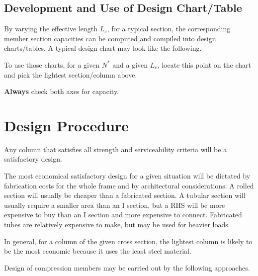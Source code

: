 \subsection{Development and Use of Design Chart/Table}
By varying the effective length $L_e$, for a typical section, the corresponding member section capacities can be computed and compiled into design charts/tables. A typical design chart may look like the following.
\begin{figure}[H]
\footnotesize\centering

\end{figure}

To use those charts, for a given $N^*$ and a given $L_e$, locate this point on the chart and pick the lightest section/column above.
\begin{figure}[H]
\footnotesize\centering

\end{figure}
\textbf{Always} check both axes for capacity.
\section{Design Procedure}
Any column that satisfies all strength and serviceability criteria will be a satisfactory design.

The most economical satisfactory design for a given situation will be dictated by fabrication costs for the whole frame and by architectural considerations. A rolled section will usually be cheaper than a fabricated section. A tubular section will usually require a smaller area than an I section, but a RHS will be more expensive to buy than an I section and more expensive to connect. Fabricated tubes are relatively expensive to make, but may be used for heavier loads.

In general, for a column of the given cross section, the lightest column is likely to be the most economic because it uses the least steel material.

Design of compression members may be carried out by the following approaches.
